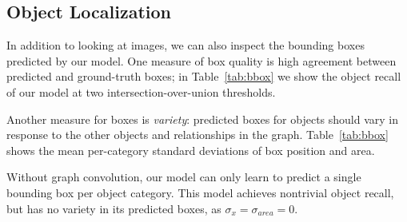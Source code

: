 \documentclass[10pt,twocolumn,letterpaper]{article}
\begin{document}
\begin{table}
  \centering
  \setlength{\tabcolsep}{0.75mm}
  \vspace{1mm}
  \caption{
    Statistics of predicted bounding boxes.
    R@$t$ is object recall with an IoU threshold of $t$, and measures agreement with ground-truth boxes.
    $\sigma_x$ and $\sigma_{area}$ measure box variety by computing the standard deviation of box $x$-positions and areas within
    each object category and then averaging across categories.
  }
  \vspace{-2mm}
  \label{tab:bbox}
\end{table}
 
\subsection{Object Localization}
In addition to looking at images, we can also inspect
the bounding boxes predicted by our model. One measure of box quality is
high agreement between predicted and ground-truth boxes; in
Table~\ref{tab:bbox} we show the object recall of our model at two
intersection-over-union thresholds.

Another measure for boxes is \emph{variety}: predicted boxes for objects 
should vary in response to the other objects and relationships in the graph.
Table~\ref{tab:bbox} shows the mean
per-category standard deviations of box position and area.

Without graph convolution, our model can only learn to predict a single bounding
box per object category. This model achieves nontrivial object recall, but has no
variety in its predicted boxes, as $\sigma_x=\sigma_{area}=0$.
\end{document}
